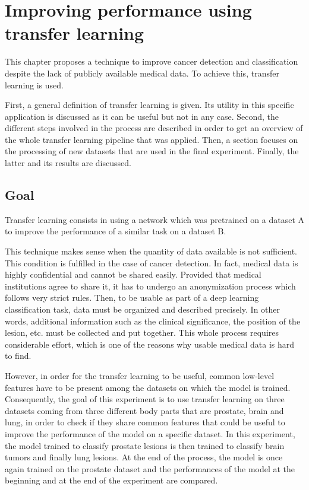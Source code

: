 
\chapter{Improving performance using transfer learning}
\label{ch:transfer_learning}
\setlength{\marginparwidth}{3cm}\leavevmode {}This chapter proposes a technique to improve cancer detection and classification despite the lack of publicly available medical data. To achieve this, transfer learning is used.

First, a general definition of transfer learning is given. Its utility in this specific application is discussed as it can be useful but not in any case. Second, the different steps involved in the process are described in order to get an overview of the whole transfer learning pipeline that was applied. Then, a section focuses on the processing of new datasets that are used in the final experiment. Finally, the latter and its results are discussed. 


\section{Goal}
\label{sec:tl_goal}
\setlength{\marginparwidth}{3cm}\leavevmode {}Transfer learning consists in using a network which was pretrained on a dataset A to improve the performance of a similar task on a dataset B.

This technique makes sense when the quantity of data available is not sufficient. This condition is fulfilled in the case of cancer detection. In fact, medical data is highly confidential and cannot be shared easily. Provided that medical institutions agree to share it, it has to undergo an anonymization process which follows very strict rules. Then, to be usable as part of a deep learning classification task, data must be organized and described precisely. In other words, additional information such as the clinical significance, the position of the lesion, etc. must be collected and put together. This whole process requires considerable effort, which is one of the reasons why usable medical data is hard to find.

However, in order for the transfer learning to be useful, common low-level features have to be present among the datasets on which the model is trained. Consequently, the goal of this experiment is to use transfer learning on three datasets coming from three different body parts that are prostate, brain and lung, in order to check if they share common features that could be useful to improve the performance of the model on a specific dataset. In this experiment, the model trained to classify prostate lesions is then trained to classify brain tumors and finally lung lesions. At the end of the process, the model is once again trained on the prostate dataset and the performances of the model at the beginning and at the end of the experiment are compared.

